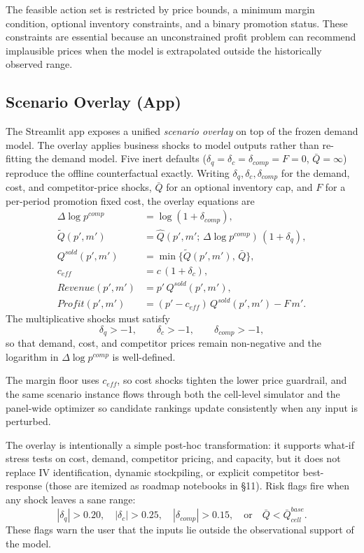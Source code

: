 \documentclass[11pt]{article}
\begin{document}
The feasible action set is restricted by price bounds, a minimum margin condition, optional inventory constraints, and a binary promotion status. These constraints are essential because an unconstrained profit problem can recommend implausible prices when the model is extrapolated outside the historically observed range.

\subsection{Scenario Overlay (App)}\label{sec:scenario}

The Streamlit app exposes a unified \emph{scenario overlay} on top of the frozen demand model. The overlay applies business shocks to model outputs rather than re-fitting the demand model. Five inert defaults
($\delta_q = \delta_c = \delta_{comp} = F = 0$, $\bar{Q}=\infty$) reproduce the offline counterfactual exactly. Writing $\delta_q,\delta_c,\delta_{comp}$ for the demand, cost, and competitor-price shocks, $\bar{Q}$ for an optional inventory cap, and $F$ for a per-period promotion fixed cost, the overlay equations are
\begin{align}
\Delta\log p^{comp} &= \log(1+\delta_{comp}), \\
\widetilde{Q}(p',m')   &= \widehat{Q}\!\left(p',m';\,\Delta\log p^{comp}\right)\,(1+\delta_q), \\
Q^{sold}(p',m')        &= \min\{\widetilde{Q}(p',m'),\,\bar{Q}\}, \\
c_{eff}                &= c\,(1+\delta_c), \\
Revenue(p',m')         &= p'\,Q^{sold}(p',m'), \\
Profit(p',m')          &= (p' - c_{eff})\,Q^{sold}(p',m') - F\,m'. \label{eq:scenario_profit}
\end{align}
The multiplicative shocks must satisfy
\begin{equation}
\delta_q>-1,\qquad \delta_c>-1,\qquad \delta_{comp}>-1,
\end{equation}
so that demand, cost, and competitor prices remain non-negative and the logarithm in $\Delta\log p^{comp}$ is well-defined.

The margin floor uses $c_{eff}$, so cost shocks tighten the lower price guardrail, and the same scenario instance flows through both the cell-level simulator and the panel-wide optimizer so candidate rankings update consistently when any input is perturbed.

The overlay is intentionally a simple post-hoc transformation: it supports what-if stress tests on cost, demand, competitor pricing, and capacity, but it does not replace IV identification, dynamic stockpiling, or explicit competitor best-response (those are itemized as roadmap notebooks in \S11). Risk flags fire when any shock leaves a sane range:
\begin{equation}
|\delta_q|>0.20,\quad |\delta_c|>0.25,\quad
|\delta_{comp}|>0.15,\quad \text{or}\quad
\bar{Q}<\bar{Q}^{base}_{cell}.
\end{equation}
These flags warn the user that the inputs lie outside the observational support of the model.
\end{document}
